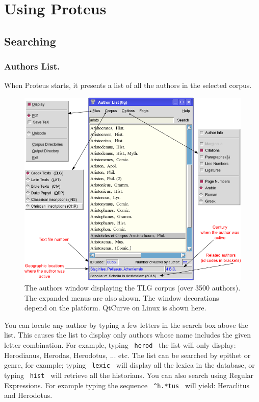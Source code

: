 \documentclass[11pt,a4paper]{article}
\begin{document}
\section{Using Proteus}
  \subsection{Searching}
    \subsubsection*{Authors List.}When Proteus starts, it presents  a
                list of all the authors in the selected corpus.

          \begin{figure}[htp]
            \begin{center}
              \includegraphics[scale=0.6]{../images/authors-en.png}
              \caption{ {\small
                          The authors window displaying
                            the TLG corpus (over 3500 authors).
                            The expanded menus are also shown.
                            The window decorations depend
                            on the platform. QtCurve on Linux
                            is shown here.
                        }
                      }
            \end{center}
          \end{figure}

      You can locate any author by typing a few letters in
      the search box above the list. This causes the list to display only authors
      whose name includes the given letter combination. For example, typing
      \verb| herod | the list will only display: Herodianus, Herodas, Herodotus, ... etc.
      The list can be searched by epithet or genre, for example;
      typing \verb| lexic | will display all the lexica in the database, or typing
      \verb| hist | will retrieve all the historians.
      You can also search using Regular Expressions. For example typing the sequence
      \verb| ^h.*tus | will yield: Heraclitus and Herodotus.
\newpage
\end{document}
